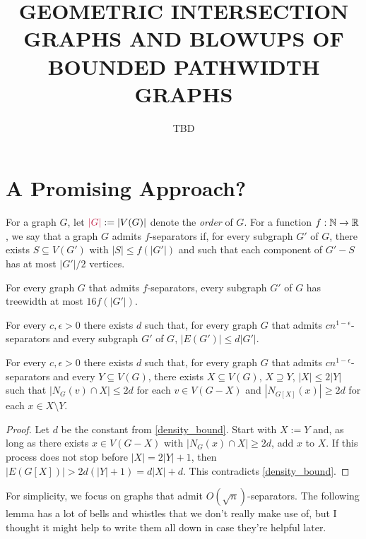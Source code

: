 \documentclass{patmorin}
\title{\MakeUppercase{\boldmath Geometric Intersection Graphs and Blowups of Bounded Pathwidth Graphs}}
\author{TBD}
\date{}
\makeatletter
\renewcommand{\ge}{\geqslant}
\renewcommand{\le}{\leqslant}
\newcommand{\defin}[1]{\emph{\textcolor{brightmaroon}{#1}}}
\def\mathcolor#1#{\@mathcolor{#1}}
\def\@mathcolor#1#2#3{%
  \protect\leavevmode
  \begingroup
    \color#1{#2}#3%
  \endgroup
}
\newcommand{\mathdefin}[1]{\mathcolor{brightmaroon}{#1}}
\makeatother
\begin{document}
\maketitle

\section{A Promising Approach?}

For a graph $G$, let $\mathdefin{|G|}:=|V(G)|$ denote the \defin{order} of $G$.  For a function $f:\mathbb{N}\to\mathbb{R}$, we say that a graph $G$ admits $f$-separators if, for every subgraph $G'$ of $G$, there exists $S\subseteq V(G')$ with $|S|\le f(|G'|)$ and such that each component of $G'-S$ has at most $|G'|/2$ vertices.

\begin{thm}\label{dvorak_norin}
  For every graph $G$ that admits $f$-separators, every subgraph $G'$ of $G$ has treewidth at most $16f(|G'|)$.
\end{thm}

\begin{thm}[??]\label{density_bound}
  For every $c,\epsilon >0$ there exists $d$ such that, for every graph $G$ that admits $cn^{1-\epsilon}$-separators and every subgraph $G'$ of $G$, $|E(G')|\le d|G'|$.
\end{thm}

\begin{lem}\label{degree_bounder}
  For every $c,\epsilon >0$ there exists $d$ such that, for every graph $G$ that admits $cn^{1-\epsilon}$-separators and every $Y\subseteq V(G)$, there exists $X\subseteq V(G)$, $X\supseteq Y$, $|X|\le 2|Y|$ such that $|N_G(v)\cap X|\le 2d$ for each $v\in V(G-X)$ and $|N_{G[X]}(x)|\ge 2d$ for each $x\in X\setminus Y$.
\end{lem}

\begin{proof}
  Let $d$ be the constant from \cref{density_bound}.
  Start with $X:=Y$ and, as long as there exists $x\in V(G-X)$ with $|N_G(x)\cap X|\ge 2d$, add $x$ to $X$.  If this process does not stop before $|X|=2|Y|+1$, then $|E(G[X])|> 2d(|Y|+1)=d|X|+d$.  This contradicts \cref{density_bound}.
\end{proof}

For simplicity, we focus on graphs that admit $O(\sqrt{n})$-separators.  The following lemma has a lot of bells and whistles that we don't really make use of, but I thought it might help to write them all down in case they're helpful later.
\end{document}
